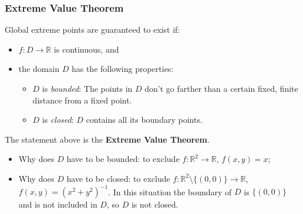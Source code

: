 \begin{frame}
  \frametitle{Extreme Value Theorem}

Global extreme points are guaranteed to exist if:

\begin{itemize}
  \item $f \colon D \to \mathbb{R}$ is continuous, and
  \item the domain $D$ has the following properties:
  \begin{itemize}
    \item $D$ is \emph{bounded}: The points in $D$ don't go farther than a certain fixed, finite distance from a fixed point.
    \item $D$ is \emph{closed}: $D$ contains all its boundary points.
  \end{itemize}
\end{itemize}
%

The statement above is the \textbf{Extreme Value Theorem}.

\begin{itemize}
  \item \pause Why does $D$ have to be bounded: \pause to exclude $f\colon \mathbb{R}^2 \to \mathbb{R}$, $f(x,y) = x$;
  \item \pause Why does $D$ have to be closed: \pause to exclude $f\colon \mathbb{R}^2\setminus\{(0,0)\} \to \mathbb{R}$, $f(x,y) = (x^2+y^2)^{-1}$. In this situation the boundary of $D$ is $\{(0,0)\}$ and is not included in $D$, so $D$ is not closed.
\end{itemize}
\end{frame}